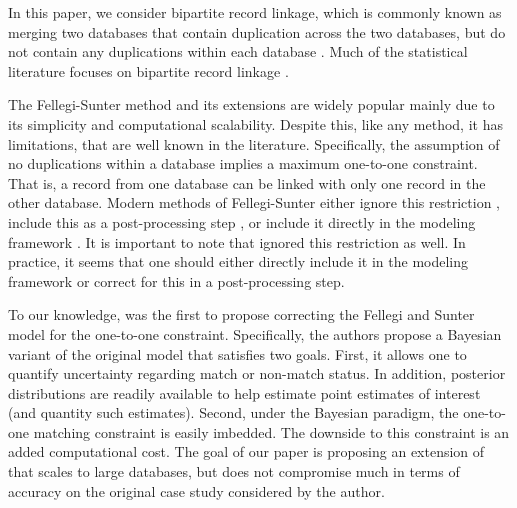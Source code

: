 \documentclass[12pt,letterpaper]{article}
\newcommand{\1}[1]{\mathbb{I}\!\left[#1\right]} %
\begin{document}

In this paper, we consider bipartite record linkage, which is commonly known as merging two databases that contain duplication across the two databases, but do not contain any duplications within each database \citep{sadinle_bayesian_2017}. Much of the statistical literature focuses on bipartite record linkage \citep{fellegi_theory_1969, jaro1989, Winkler1988, belin_1995, larsen_2001, liseo_2011,  herzog2007data, gutman_bayesian_2013, sadinle_bayesian_2017}. 

The Fellegi-Sunter method and its extensions are widely popular mainly due to its simplicity and computational scalability. Despite this, like any method, it has limitations, that are well known in the literature. Specifically, the assumption of no duplications within a database implies a maximum one-to-one constraint. That is, a record from one database can be linked with only one record in the other database. Modern methods of Fellegi-Sunter either ignore this restriction \citep{Winkler1988, belin_1995, larsen_2001}, include this as a post-processing step \citep{jaro1989}, or include it directly in the modeling framework \citep{sadinle_bayesian_2017}. It is important to note that \cite{fellegi_theory_1969} ignored this restriction as well. In practice, it seems that one should either directly include it in the modeling framework or correct for this in a post-processing step. 

To our knowledge, \cite{sadinle_bayesian_2017} was the first to propose correcting the Fellegi and Sunter model for the one-to-one constraint. Specifically, the authors propose a Bayesian variant of the original model that satisfies two goals. First, it allows one to quantify uncertainty regarding match or non-match status. In addition, posterior distributions are readily available to help estimate point estimates of interest (and quantity such estimates). Second, under the Bayesian paradigm, the one-to-one matching constraint is easily imbedded. The downside to this constraint is an added computational cost. The goal of our paper is proposing an extension of \cite{sadinle_bayesian_2017} that scales to large databases, but does not compromise much in terms of accuracy on the original case study considered by the author. 
\end{document}
